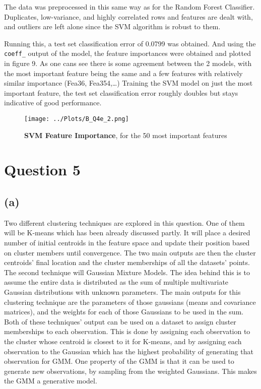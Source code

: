 \documentclass[12pt]{report} %
\begin{document}
The data was preprocessed in this same way as for the Random Forest Classifier. Duplicates, low-variance, and highly correlated rows and features are dealt with, and outliers are left alone since the SVM algorithm is robust to them.  

Running this, a test set classification error of 0.0799 was obtained. And using the \texttt{coeff\_} output of the model, the feature importances were obtained and plotted in figure 9. As one cans see there is some agreement between the 2 models, with the most important feature being the same and a few features with relatively similar importance (Fea36, Fea354,\ldots)  
Training the SVM model on just the most important feature, the test set classification error roughly doubles but stays indicative of good performance.

\begin{figure}[htbp]
    \centering
    \texttt{[image: ../Plots/B\_Q4e\_2.png]}
    \caption{\textbf{SVM Feature Importance}, for the 50 most important features}
\end{figure}

\newpage

\section*{Question 5}

\subsection*{(a)}

Two different clustering techniques are explored in this question. One of them will be K-means which has been already discussed partly. It will place a desired number of initial centroids in the feature space and update their position based on cluster members until convergence. The two main outputs are then the cluster centroids' final location and the cluster memberships of all the datasets' points.  
The second technique will Gaussian Mixture Models. The idea behind this is to assume the entire data is distributed as the sum of multiple multivariate Gaussian distributions with unknown parameters\cite[p. 260]{sklearn_book}. The main outputs for this clustering technique are the parameters of those gaussians (means and covariance matrices), and the weights for each of those Gaussians to be used in the sum.  
Both of these techniques' output can be used on a dataset to assign cluster memberships to each observation. This is done by assigning each observation to the cluster whose centroid is closest to it for K-means, and by assigning each observation to the Gaussian which has the highest probability of generating that observation for GMM. One property of the GMM is that it can be used to generate new observations, by sampling from the weighted Gaussians. This makes the GMM a generative model.  
\end{document}

